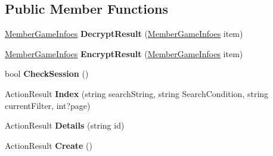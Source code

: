 \subsection*{Public Member Functions}
\begin{DoxyCompactItemize}
\item 
\hyperlink{class_cloud_bread_admin_web_1_1_member_game_infoes}{Member\+Game\+Infoes} {\bfseries Decrypt\+Result} (\hyperlink{class_cloud_bread_admin_web_1_1_member_game_infoes}{Member\+Game\+Infoes} item)\hypertarget{class_cloud_bread_admin_web_1_1_controllers_1_1_member_game_infoes_controller_a59ae7e581adf00d39d6ab2b6eb3532dc}{}\label{class_cloud_bread_admin_web_1_1_controllers_1_1_member_game_infoes_controller_a59ae7e581adf00d39d6ab2b6eb3532dc}

\item 
\hyperlink{class_cloud_bread_admin_web_1_1_member_game_infoes}{Member\+Game\+Infoes} {\bfseries Encrypt\+Result} (\hyperlink{class_cloud_bread_admin_web_1_1_member_game_infoes}{Member\+Game\+Infoes} item)\hypertarget{class_cloud_bread_admin_web_1_1_controllers_1_1_member_game_infoes_controller_a88f805c52482a1c0429ce4bdfb209ec7}{}\label{class_cloud_bread_admin_web_1_1_controllers_1_1_member_game_infoes_controller_a88f805c52482a1c0429ce4bdfb209ec7}

\item 
bool {\bfseries Check\+Session} ()\hypertarget{class_cloud_bread_admin_web_1_1_controllers_1_1_member_game_infoes_controller_a971eb9c56633803b2777b3673756c811}{}\label{class_cloud_bread_admin_web_1_1_controllers_1_1_member_game_infoes_controller_a971eb9c56633803b2777b3673756c811}

\item 
Action\+Result {\bfseries Index} (string search\+String, string Search\+Condition, string current\+Filter, int?page)\hypertarget{class_cloud_bread_admin_web_1_1_controllers_1_1_member_game_infoes_controller_a85f1654dae6c92131405203cf5db3772}{}\label{class_cloud_bread_admin_web_1_1_controllers_1_1_member_game_infoes_controller_a85f1654dae6c92131405203cf5db3772}

\item 
Action\+Result {\bfseries Details} (string id)\hypertarget{class_cloud_bread_admin_web_1_1_controllers_1_1_member_game_infoes_controller_a6bf3cb823296474e2e21c02a905a6cdf}{}\label{class_cloud_bread_admin_web_1_1_controllers_1_1_member_game_infoes_controller_a6bf3cb823296474e2e21c02a905a6cdf}

\item 
Action\+Result {\bfseries Create} ()\hypertarget{class_cloud_bread_admin_web_1_1_controllers_1_1_member_game_infoes_controller_a569c95ecd9dbff0a992ad90f838fbf12}{}\label{class_cloud_bread_admin_web_1_1_controllers_1_1_member_game_infoes_controller_a569c95ecd9dbff0a992ad90f838fbf12}


\end{DoxyCompactItemize}
